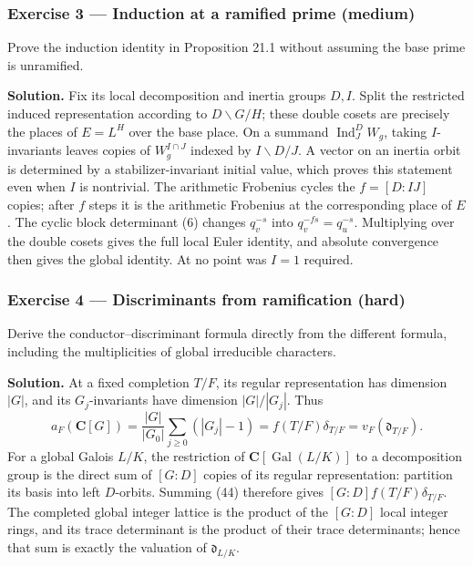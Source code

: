 \documentclass[11pt,a4paper]{article}
\begin{document}
\subsubsection{Exercise 3 --- Induction at a ramified prime
(medium)}\label{exercise-3-induction-at-a-ramified-prime-medium}

Prove the induction identity in Proposition 21.1 without assuming the
base prime is unramified.

\textbf{Solution.} Fix its local decomposition and inertia groups
\(D,I\). Split the restricted induced representation according to
\(D\backslash G/H\); these double cosets are precisely the places of
\(E=L^H\) over the base place. On a summand
\(\operatorname{Ind}_J^D W_g\), taking \(I\)-invariants leaves copies of
\(W_g^{I\cap J}\) indexed by \(I\backslash D/J\). A vector on an inertia
orbit is determined by a stabilizer-invariant initial value, which
proves this statement even when \(I\) is nontrivial. The arithmetic
Frobenius cycles the \(f=[D:IJ]\) copies; after \(f\) steps it is the
arithmetic Frobenius at the corresponding place of \(E\). The cyclic
block determinant (6) changes \(q_v^{-s}\) into \(q_v^{-fs}=q_u^{-s}\).
Multiplying over the double cosets gives the full local Euler identity,
and absolute convergence then gives the global identity. At no point was
\(I=1\) required.

\subsubsection{Exercise 4 --- Discriminants from ramification
(hard)}\label{exercise-4-discriminants-from-ramification-hard}

Derive the conductor--discriminant formula directly from the different
formula, including the multiplicities of global irreducible characters.

\textbf{Solution.} At a fixed completion \(T/F\), its regular
representation has dimension \(|G|\), and its \(G_j\)-invariants have
dimension \(|G|/|G_j|\). Thus \[
a_F(\mathbf C[G])
=\frac{|G|}{|G_0|}\sum_{j\geq0}(|G_j|-1)
=f(T/F)\delta_{T/F}
=v_F(\mathfrak d_{T/F}).
\tag{44}
\] For a global Galois \(L/K\), the restriction of
\(\mathbf C[\operatorname{Gal}(L/K)]\) to a decomposition group is the
direct sum of \([G:D]\) copies of its regular representation: partition
its basis into left \(D\)-orbits. Summing (44) therefore gives
\([G:D]f(T/F)\delta_{T/F}\). The completed global integer lattice is the
product of the \([G:D]\) local integer rings, and its trace determinant
is the product of their trace determinants; hence that sum is exactly
the valuation of \(\mathfrak d_{L/K}\).
\end{document}
